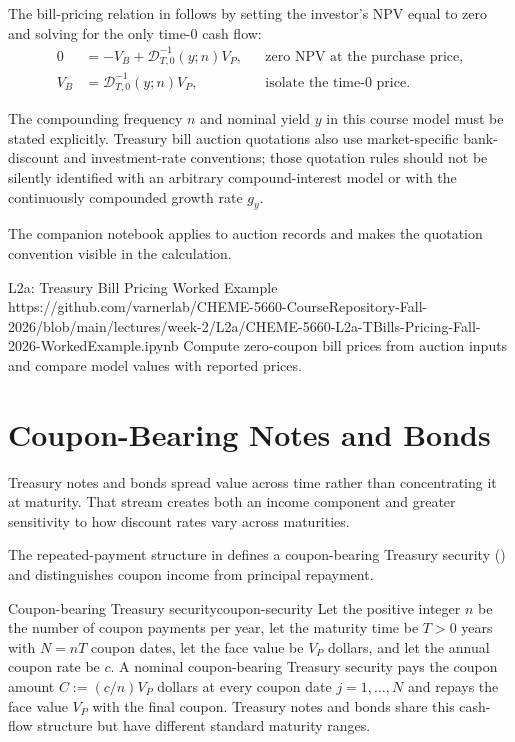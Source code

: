 \documentclass[11pt]{article}
\newcommand{\D}{\mathcal{D}}
\begin{document}
The bill-pricing relation in  follows by setting the investor's NPV equal to zero and solving for the only time-0 cash flow:
\begin{align*}
  0
    &= -V_B+\D_{T,0}^{-1}(y;n)V_P,
    && \text{zero NPV at the purchase price},\\
  V_B
    &= \D_{T,0}^{-1}(y;n)V_P,
    && \text{isolate the time-0 price.}
\end{align*}

The compounding frequency $n$ and nominal yield $y$ in this course model must be stated explicitly. Treasury bill auction quotations also use market-specific bank-discount and investment-rate conventions; those quotation rules should not be silently identified with an arbitrary compound-interest model or with the continuously compounded growth rate $g_y$.

The companion notebook applies  to auction records and makes the quotation convention visible in the calculation.

\notebooklink
  {L2a: Treasury Bill Pricing Worked Example}
  {https://github.com/varnerlab/CHEME-5660-CourseRepository-Fall-2026/blob/main/lectures/week-2/L2a/CHEME-5660-L2a-TBills-Pricing-Fall-2026-WorkedExample.ipynb}
  {Compute zero-coupon bill prices from auction inputs and compare model values with reported prices.}

\section{Coupon-Bearing Notes and Bonds}

Treasury notes and bonds spread value across time rather than concentrating it at maturity. That stream creates both an income component and greater sensitivity to how discount rates vary across maturities.

The repeated-payment structure in  defines a coupon-bearing Treasury security () and distinguishes coupon income from principal repayment.

\begin{definition}{Coupon-bearing Treasury security}{coupon-security}
Let the positive integer $n$ be the number of coupon payments per year, let the maturity time be $T>0$ years with $N=nT$ coupon dates, let the face value be $V_P$ dollars, and let the annual coupon rate be $c$. A nominal coupon-bearing Treasury security pays the coupon amount $C:=(c/n)V_P$ dollars at every coupon date $j=1,\ldots,N$ and repays the face value $V_P$ with the final coupon. Treasury notes and bonds share this cash-flow structure but have different standard maturity ranges.
\end{definition}
\end{document}

